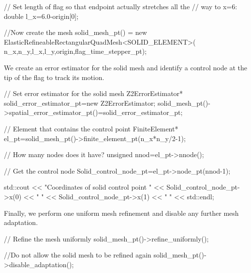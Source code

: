 \begin{DoxyCodeInclude}
 \textcolor{comment}{// Set length of flag so that endpoint actually stretches all the}
 \textcolor{comment}{// way to x=6:}
 \textcolor{keywordtype}{double} l\_x=6.0-origin[0];

 \textcolor{comment}{//Now create the mesh}
 solid\_mesh\_pt() = \textcolor{keyword}{new} ElasticRefineableRectangularQuadMesh<SOLID\_ELEMENT>(
  n\_x,n\_y,l\_x,l\_y,origin,flag\_time\_stepper\_pt);

\end{DoxyCodeInclude}


We create an error estimator for the solid mesh and identify a control node at the tip of the flag to track its motion.


\begin{DoxyCodeInclude}
 
 \textcolor{comment}{// Set error estimator for the solid mesh}
 Z2ErrorEstimator* solid\_error\_estimator\_pt=\textcolor{keyword}{new} Z2ErrorEstimator;
 solid\_mesh\_pt()->spatial\_error\_estimator\_pt()=solid\_error\_estimator\_pt;


 \textcolor{comment}{// Element that contains the control point}
 FiniteElement* el\_pt=solid\_mesh\_pt()->finite\_element\_pt(n\_x*n\_y/2-1);

 \textcolor{comment}{// How many nodes does it have?}
 \textcolor{keywordtype}{unsigned} nnod=el\_pt->nnode();

 \textcolor{comment}{// Get the control node}
 Solid\_control\_node\_pt=el\_pt->node\_pt(nnod-1);

 std::cout << \textcolor{stringliteral}{"Coordinates of solid control point "} 
           << Solid\_control\_node\_pt->x(0) << \textcolor{stringliteral}{" "} 
           << Solid\_control\_node\_pt->x(1) << \textcolor{stringliteral}{" "} << std::endl;

\end{DoxyCodeInclude}


Finally, we perform one uniform mesh refinement and disable any further mesh adaptation.


\begin{DoxyCodeInclude}

 \textcolor{comment}{// Refine the mesh uniformly}
 solid\_mesh\_pt()->refine\_uniformly();

 \textcolor{comment}{//Do not allow the solid mesh to be refined again}
 solid\_mesh\_pt()->disable\_adaptation();

\end{DoxyCodeInclude}


